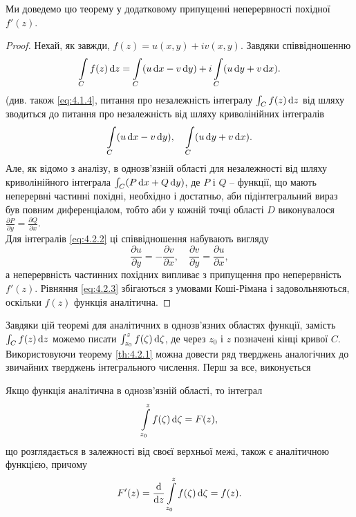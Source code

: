 Ми доведемо цю теорему у додатковому припущенні неперервності похідної $f'(z)$.

\begin{proof}
Нехай, як завжди, $f(z) = u(x, y) + i v(x, y)$. Завдяки співвідношенню
\begin{equation}
\label{eq:4.2.1}
\displaystyle\int\limits_C f(z) \mathop{}\!\mathrm{d} z = \displaystyle\int\limits_C (u \mathop{}\!\mathrm{d} x - v \mathop{}\!\mathrm{d} y) + i \displaystyle\int\limits_C (u \mathop{}\!\mathrm{d} y + v \mathop{}\!\mathrm{d} x).
\end{equation}
(див. також \eqref{eq:4.1.4}, питання про незалежність інтегралу $\int_C f(z) \mathop{}\!\mathrm{d} z$ від шляху зводиться до питання про незалежність від шляху криволінійних інтегралів
\begin{equation}
\label{eq:4.2.2}
\displaystyle\int\limits_C (u \mathop{}\!\mathrm{d} x - v \mathop{}\!\mathrm{d} y), \quad \displaystyle\int\limits_C (u \mathop{}\!\mathrm{d} y + v \mathop{}\!\mathrm{d} x).
\end{equation}
Але, як відомо з аналізу, в однозв'язній області для незалежності від шляху криволінійного інтеграла $\int_C (P \mathop{}\!\mathrm{d} x + Q \mathop{}\!\mathrm{d} y)$, де $P$ і $Q$ -- функції, що мають неперервні частинні похідні, необхідно і достатньо, аби підінтегральний вираз був повним диференціалом, тобто аби у кожній точці області $D$ виконувалося $\frac{\partial P}{\partial y} = \frac{\partial Q}{\partial x}$. \\

Для інтегралів \eqref{eq:4.2.2} ці співвідношення набувають вигляду
\begin{equation}
\label{eq:4.2.3}
\dfrac{\partial u}{\partial y} = - \dfrac{\partial v}{\partial x}, \quad \dfrac{\partial v}{\partial y} = \dfrac{\partial u}{\partial x},
\end{equation} а неперервність частинних похідних випливає з припущення про неперервність $f'(z)$. Рівняння \eqref{eq:4.2.3} збігаються з умовами Коші-Рімана і задовольняються, оскільки $f(z)$ функція аналітична.
\end{proof}

Завдяки цій теоремі для аналітичних в однозв'язних областях функції, замість $\int_C f(z) \mathop{}\!\mathrm{d} z$ можемо писати $\int_{z_0}^z f(\zeta) \mathop{}\!\mathrm{d} \zeta$, де через $z_0$ і $z$ позначені кінці кривої $C$. \\

Використовуючи теорему \ref{th:4.2.1} можна довести ряд тверджень аналогічних до звичайних тверджень інтегрального числення. Перш за все, виконується
\begin{theorem}
\label{th:4.2.2}
Якщо функція аналітична в однозв'язній області, то інтеграл
\begin{equation}
\label{eq:4.2.4}
\displaystyle\int\limits_{z_0}^z f(\zeta) \mathop{}\!\mathrm{d} \zeta = F(z),
\end{equation}
що розглядається в залежності від своєї верхньої межі, також є аналітичною функцією, причому
\begin{equation}
\label{eq:4.2.5}
F'(z) = \dfrac{\mathop{}\!\mathrm{d}}{\mathop{}\!\mathrm{d} z} \displaystyle\int\limits_{z_0}^z f(\zeta) \mathop{}\!\mathrm{d} \zeta = f(z).
\end{equation}
\end{theorem}

